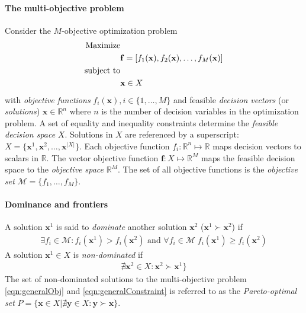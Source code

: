 \paragraph{The multi-objective problem}
Consider the $M$-objective optimization problem
\begin{align}
\text{Maximize}& \notag \\
& \mathbf{f} = [f_1(\mathbf{x}), f_2(\mathbf{x}), \ldots, f_M(\mathbf{x}) ] \label{eqn:generalObj}\\
\text{subject to}& \notag \\
& \mathbf{x} \in X \label{eqn:generalConstraint}
\end{align}
with \textit{objective functions} $f_i(\mathbf{x}), i \in \{1,\ldots,M\}$ and feasible \textit{decision vectors} (or \textit{solutions}) $\mathbf{x} \in \mathbb{R}^n$ where $n$ is the number of decision variables in the optimization problem. A set of equality and inequality constraints determine the \textit{feasible decision space} $X$. Solutions in $X$ are referenced by a superscript: $X = \{\mathbf{x}^1,\mathbf{x}^2,\ldots,\mathbf{x}^{|X|}\}$. Each objective function $f_i : \mathbb{R}^n \mapsto \mathbb{R}$ maps decision vectors to scalars in $\mathbb{R}$. The vector objective function $\mathbf{f} : X \mapsto \mathbb{R}^M$ maps the feasible decision space to the \textit{objective space} $\mathbb{R}^M$. The set of all objective functions is the \textit{objective set} $\mathcal{M} = \{f_1,\ldots,f_M\}$.

\paragraph{Dominance and frontiers}
A solution $\mathbf{x}^1$ is said to \textit{dominate} another solution $\mathbf{x}^2$ ($\mathbf{x}^1 \succ \mathbf{x}^2$) if
\begin{align}
\exists f_i \in \mathcal{M} : f_i(\mathbf{x}^1) > f_i(\mathbf{x}^2) \text{ and } \forall f_i \in \mathcal{M} \; f_i(\mathbf{x}^1) \ge f_i(\mathbf{x}^2)
\end{align}
A solution $\mathbf{x}^1 \in X$ is \textit{non-dominated} if
\begin{align}
\nexists \mathbf{x}^2 \in X : \mathbf{x}^2 \succ \mathbf{x}^1 \}
\end{align}
The set of non-dominated solutions to the multi-objective problem \eqref{eqn:generalObj} and \eqref{eqn:generalConstraint} is referred to as the \textit{Pareto-optimal set} $P = \{\mathbf{x} \in X | \nexists \mathbf{y} \in X : \mathbf{y} \succ \mathbf{x} \}$.

